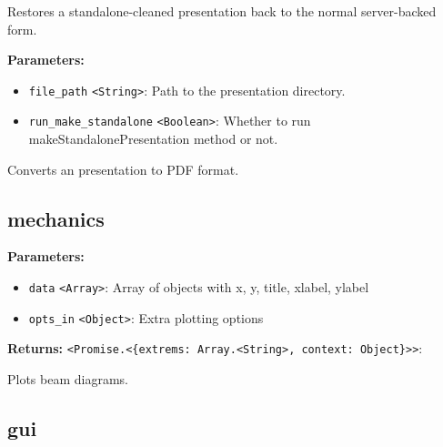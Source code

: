 \documentclass[12pt,a4paper]{article}
\begin{document}
\noindent Restores a standalone-cleaned presentation back to the normal server-backed form.

\vspace{5mm}
\noindent {}


\noindent \textbf{Parameters:}
\begin{itemize}
  \item \texttt{file\_path} \texttt{<String>}: Path to the presentation directory.
  \item \texttt{run\_make\_standalone} \texttt{<Boolean>}: Whether to run makeStandalonePresentation method or not.
\end{itemize}

\noindent Converts an presentation to PDF format.


\subsection{mechanics}
\vspace{5mm}
\noindent {}


\noindent \textbf{Parameters:}
\begin{itemize}
  \item \texttt{data} \texttt{<Array>}: Array of objects with x, y, title, xlabel, ylabel
  \item \texttt{opts\_in} \texttt{<Object>}: Extra plotting options
\end{itemize}

\noindent \textbf{Returns:} \texttt{<Promise.<\{extrems: Array.<String>, context: Object\}>>}:

\noindent Plots beam diagrams.


\subsection{gui}
\vspace{5mm}
\noindent {}
\end{document}
